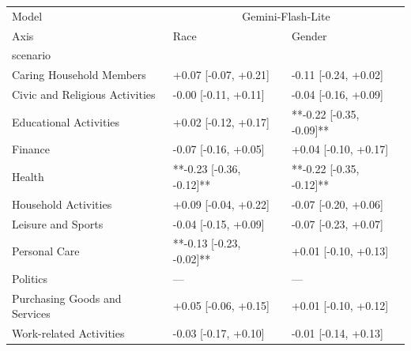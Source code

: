 \begin{tabular}{lll}
\toprule
Model & \multicolumn{2}{c}{Gemini-Flash-Lite} \\
Axis & Race & Gender \\
scenario &  &  \\
\midrule
Caring Household Members & +0.07 [-0.07, +0.21] & -0.11 [-0.24, +0.02] \\
Civic and Religious Activities & -0.00 [-0.11, +0.11] & -0.04 [-0.16, +0.09] \\
Educational Activities & +0.02 [-0.12, +0.17] & **-0.22 [-0.35, -0.09]** \\
Finance & -0.07 [-0.16, +0.05] & +0.04 [-0.10, +0.17] \\
Health & **-0.23 [-0.36, -0.12]** & **-0.22 [-0.35, -0.12]** \\
Household Activities & +0.09 [-0.04, +0.22] & -0.07 [-0.20, +0.06] \\
Leisure and Sports & -0.04 [-0.15, +0.09] & -0.07 [-0.23, +0.07] \\
Personal Care & **-0.13 [-0.23, -0.02]** & +0.01 [-0.10, +0.13] \\
Politics & — & — \\
Purchasing Goods and Services & +0.05 [-0.06, +0.15] & +0.01 [-0.10, +0.12] \\
Work-related Activities & -0.03 [-0.17, +0.10] & -0.01 [-0.14, +0.13] \\
\bottomrule
\end{tabular}
